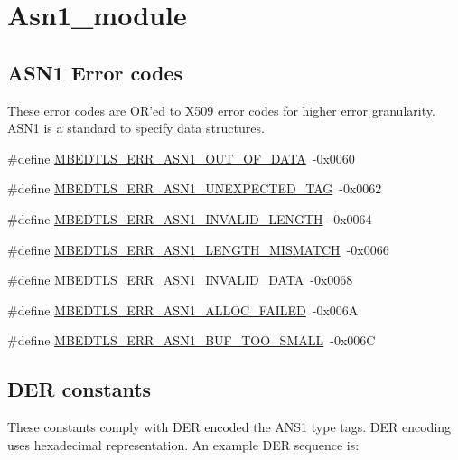 \hypertarget{group__asn1__module}{\section{Asn1\-\_\-module}
\label{group__asn1__module}
}
\subsection*{A\-S\-N1 Error codes}
\label{_amgrp91652e79e1691c582917ccf754f9d814}%
These error codes are O\-R'ed to X509 error codes for higher error granularity. A\-S\-N1 is a standard to specify data structures. \begin{DoxyCompactItemize}
\item 
\#define \hyperlink{group__asn1__module_ga284c12cf03a4ffeee89a63750f00dfdd}{M\-B\-E\-D\-T\-L\-S\-\_\-\-E\-R\-R\-\_\-\-A\-S\-N1\-\_\-\-O\-U\-T\-\_\-\-O\-F\-\_\-\-D\-A\-T\-A}~-\/0x0060
\item 
\#define \hyperlink{group__asn1__module_gab055945fda47ad0e16dc59f8c5ecb86e}{M\-B\-E\-D\-T\-L\-S\-\_\-\-E\-R\-R\-\_\-\-A\-S\-N1\-\_\-\-U\-N\-E\-X\-P\-E\-C\-T\-E\-D\-\_\-\-T\-A\-G}~-\/0x0062
\item 
\#define \hyperlink{group__asn1__module_ga0ebe8e0a4894533db505303504eea59b}{M\-B\-E\-D\-T\-L\-S\-\_\-\-E\-R\-R\-\_\-\-A\-S\-N1\-\_\-\-I\-N\-V\-A\-L\-I\-D\-\_\-\-L\-E\-N\-G\-T\-H}~-\/0x0064
\item 
\#define \hyperlink{group__asn1__module_gacf6fad8d80fa050c3463539412674a20}{M\-B\-E\-D\-T\-L\-S\-\_\-\-E\-R\-R\-\_\-\-A\-S\-N1\-\_\-\-L\-E\-N\-G\-T\-H\-\_\-\-M\-I\-S\-M\-A\-T\-C\-H}~-\/0x0066
\item 
\#define \hyperlink{group__asn1__module_ga9ac36bf8c63a9968afe1d35d0569e4d8}{M\-B\-E\-D\-T\-L\-S\-\_\-\-E\-R\-R\-\_\-\-A\-S\-N1\-\_\-\-I\-N\-V\-A\-L\-I\-D\-\_\-\-D\-A\-T\-A}~-\/0x0068
\item 
\#define \hyperlink{group__asn1__module_gab7d40360e48e414ffa1a4df1961723d2}{M\-B\-E\-D\-T\-L\-S\-\_\-\-E\-R\-R\-\_\-\-A\-S\-N1\-\_\-\-A\-L\-L\-O\-C\-\_\-\-F\-A\-I\-L\-E\-D}~-\/0x006\-A
\item 
\#define \hyperlink{group__asn1__module_gaf9bf64017ed866c846b506e80dc15e94}{M\-B\-E\-D\-T\-L\-S\-\_\-\-E\-R\-R\-\_\-\-A\-S\-N1\-\_\-\-B\-U\-F\-\_\-\-T\-O\-O\-\_\-\-S\-M\-A\-L\-L}~-\/0x006\-C
\end{DoxyCompactItemize}
\subsection*{D\-E\-R constants}
\label{_amgrpeab69e4214cba23802e5f50d9da845b8}%
These constants comply with D\-E\-R encoded the A\-N\-S1 type tags. D\-E\-R encoding uses hexadecimal representation. An example D\-E\-R sequence is\-:\par

